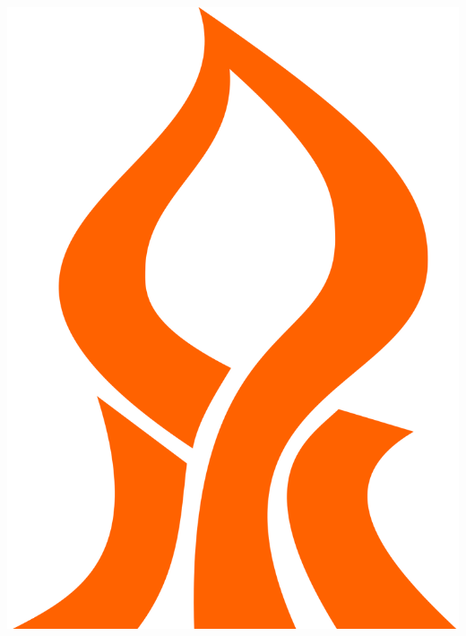 \documentclass[english,12pt]{article}
\begin{document}
\begin{titlepage}

\newcommand{\HRule}{\rule{\linewidth}{0.5mm}} 

\center %
 


\includegraphics[scale=0.025]{images/bgu.png}\\[1cm] 


 



\end{titlepage}
\end{document}
